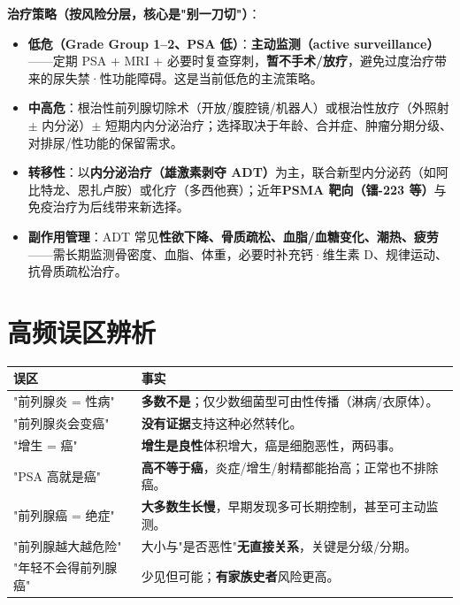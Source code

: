 \documentclass[12pt,UTF8,openany]{ctexbook}
\begin{document}
\textbf{治疗策略（按风险分层，核心是"别一刀切"）}：
\begin{itemize}[leftmargin=2em,itemsep=0.3em]
  \item \textbf{低危（Grade Group 1--2、PSA 低）}：\textbf{主动监测（active surveillance）}——定期 PSA + MRI + 必要时复查穿刺，\textbf{暂不手术/放疗}，避免过度治疗带来的尿失禁·性功能障碍。这是当前低危的主流策略。
  \item \textbf{中高危}：根治性前列腺切除术（开放/腹腔镜/机器人）或根治性放疗（外照射 $\pm$ 内分泌）$\pm$ 短期内内分泌治疗；选择取决于年龄、合并症、肿瘤分期分级、对排尿/性功能的保留需求。
  \item \textbf{转移性}：以\textbf{内分泌治疗（雄激素剥夺 ADT）}为主，联合新型内分泌药（如阿比特龙、恩扎卢胺）或化疗（多西他赛）；近年\textbf{PSMA 靶向（镭-223 等）}与免疫治疗为后线带来新选择。
  \item \textbf{副作用管理}：ADT 常见\textbf{性欲下降、骨质疏松、血脂/血糖变化、潮热、疲劳}——需长期监测骨密度、血脂、体重，必要时补充钙·维生素 D、规律运动、抗骨质疏松治疗。
\end{itemize}

\section{高频误区辨析}

\begin{tabularx}{\textwidth}{l X}
\toprule
\textbf{误区} & \textbf{事实} \\
\midrule
"前列腺炎 = 性病" & \textbf{多数不是}；仅少数细菌型可由性传播（淋病/衣原体）。 \\
"前列腺炎会变癌" & \textbf{没有证据}支持这种必然转化。 \\
"增生 = 癌" & \textbf{增生是良性}体积增大，癌是细胞恶性，两码事。 \\
"PSA 高就是癌" & \textbf{高不等于癌}，炎症/增生/射精都能抬高；正常也不排除癌。 \\
"前列腺癌 = 绝症" & \textbf{大多数生长慢}，早期发现多可长期控制，甚至可主动监测。 \\
"前列腺越大越危险" & 大小与"是否恶性"\textbf{无直接关系}，关键是分级/分期。 \\
"年轻不会得前列腺癌" & 少见但可能；\textbf{有家族史者}风险更高。 \\
\bottomrule
\end{tabularx}
\end{document}
